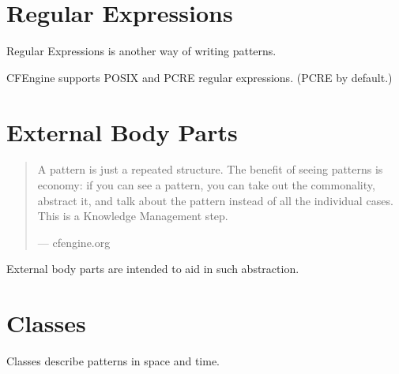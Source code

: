 




\section{Regular Expressions}

Regular Expressions is another way of writing patterns.

CFEngine supports POSIX and PCRE regular expressions.  (PCRE by default.)

\begin{codelisting}
\end{codelisting}





\section{External Body Parts}

\begin{quotation}
A pattern is just a repeated structure. The benefit of seeing patterns is economy: if you can see a pattern, you can take out the commonality, abstract it, and talk about the pattern instead of all the individual cases. This is a Knowledge Management step.

--- cfengine.org
\end{quotation}

External body parts are intended to aid in such abstraction.





\section{Classes}

Classes describe patterns in space and time.

